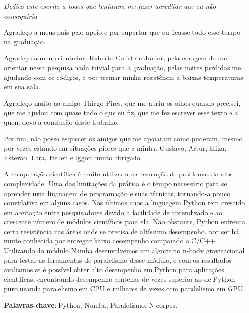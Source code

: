 \documentclass[
	12pt,				%
	a4paper,			%
	english,			%
	openright,				%
	brazil,				%
	oneside]{abntex2}
\begin{document}
\begin{dedicatoria}
   \vspace*{\fill}
   \centering
   \noindent
   \textit{Dedico este escrito a todos que tentaram me fazer acreditar que eu não conseguiria.} \vspace*{\fill}
\end{dedicatoria}


\begin{agradecimentos}
Agradeço a meus pais pelo apoio e por suportar que eu ficasse todo esse tempo na graduação.

Agradeço a meu orientador, Roberto Colistete Júnior, pela coragem de me orientar nessa pesquisa nada trivial para a graduação, pelas noites perdidas me ajudando com os códigos, e por treinar minha resistência a baixas temperaturas em sua sala.

Agradeço muito ao amigo Thiago Pires, que me abriu os olhos quando precisei, que me ajudou com quase tudo o que eu fiz, que me fez escrever esse texto e a quem devo a conclusão deste trabalho.

Por fim, não posso esquecer os amigos que me apoiaram como puderam, mesmo por vezes estando em situações piores que a minha. Gustavo, Artur, Eliza, Estevão, Lara, Hellen e Iggor, muito obrigado.

\end{agradecimentos}


\setlength{\absparsep}{18pt} %
\begin{resumo}

	A computação científica é muito utilizada na resolução de problemas de alta complexidade. Uma das limitações da prática é o tempo necessário para se aprender uma linguagem de programação e suas técnicas, tornando-a pouco convidativa em alguns casos. Nos últimos anos a linguagem Python tem crescido em aceitação entre pesquisadores devido a facilidade de aprendizado e ao crescente número de módulos científicos para ela. Não obstante, Python enfrenta certa resistência nas áreas onde se precisa de altíssimo desempenho, por ser há muito conhecida por entregar baixo desempenho comparado a C/C++. Utilizando do módulo Numba desenvolvemos um algoritmo n-body gravitacional para testar as ferramentas de paralelismo desse módulo, e com os resultados avaliamos se é possível obter alto desempenho em Python para aplicações científicas, encontrando desempenho centenas de vezes superior ao de Python puro usando paralelismo em CPU e milhares de vezes com paralelismo em GPU.


\textbf{Palavras-chave}: Python, Numba, Paralelismo, N-corpos.
\end{resumo}
\end{document}
